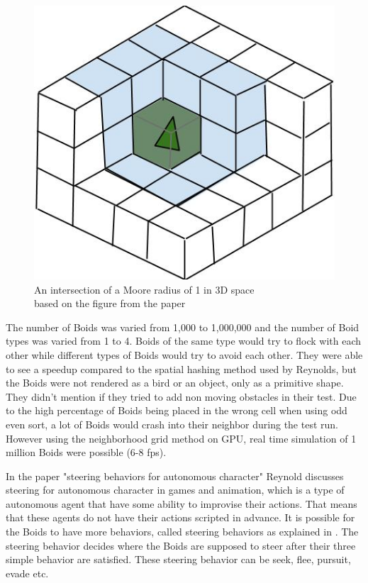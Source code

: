 \begin{figure}[H]
    \centering
    \includegraphics[width=0.5\linewidth]{images/3dgrid}
    \caption[Moore radius illustrated in 3D space]{An intersection of a Moore radius of 1 in 3D space \\ based on the figure from the paper \citep{Joselli2009}}\label{fig:3dgrid}
\end{figure}

The number of Boids was varied from 1,000 to 1,000,000 and the number of Boid types was varied from 1 to 4. Boids of the same type would try to flock with each other while different types of Boids would try to avoid each other.
They were able to see a speedup compared to the spatial hashing method used by Reynolds, but the Boids were not rendered as a bird or an object, only as a primitive shape. They didn't mention if they tried to add non moving obstacles in their test. Due to the high percentage of Boids being placed in the wrong cell when using odd even sort, a lot of Boids would crash into their neighbor during the test run. However using the neighborhood grid method on GPU, real time simulation of 1 million Boids were possible (6-8 fps).

In the paper "steering behaviors for autonomous character" Reynold discusses steering for autonomous character in games and animation, which is a type of autonomous agent that have some ability to improvise their actions. That means that these agents do not have their actions scripted in advance.
It is possible for the Boids to have more behaviors, called steering behaviors as explained in \citep{Reynolds1999}. The steering behavior decides where the Boids are supposed to steer after their three simple behavior are satisfied.  These steering behavior can be seek, flee, pursuit, evade etc. 


